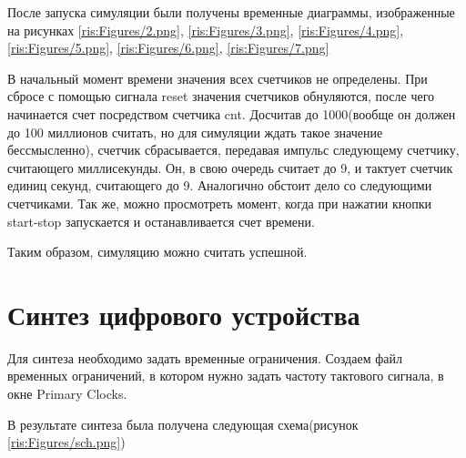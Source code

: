 \begin{sloppypar}
После запуска симуляции были получены временные диаграммы, изображенные на рисунках \ref{ris:Figures/2.png}, \ref{ris:Figures/3.png}, \ref{ris:Figures/4.png}, \ref{ris:Figures/5.png}, \ref{ris:Figures/6.png}, \ref{ris:Figures/7.png}%


В начальный момент времени значения всех счетчиков не определены. При сбросе с помощью сигнала reset значения счетчиков обнуляются, после чего начинается счет посредством счетчика cnt. Досчитав до 1000(вообще он должен до 100 миллионов считать, но для симуляции ждать такое значение бессмысленно), счетчик сбрасывается, передавая импульс следующему счетчику, считающего миллисекунды. Он, в свою очередь считает до 9, и тактует счетчик единиц секунд, считающего до 9. Аналогично обстоит дело со следующими счетчиками. Так же, можно просмотреть момент, когда при нажатии кнопки start-stop запускается и останавливается счет времени.

\newpage
{} 
Таким образом, симуляцию можно считать успешной.


\section{Синтез цифрового устройства} %
Для синтеза необходимо задать временные ограничения. Создаем файл временных ограничений, в котором нужно задать частоту тактового сигнала, в окне Primary Clocks. 

В результате синтеза была получена следующая схема(рисунок \ref{ris:Figures/sch.png})
\begin{landscape}
\end{landscape}


\end{sloppypar}
